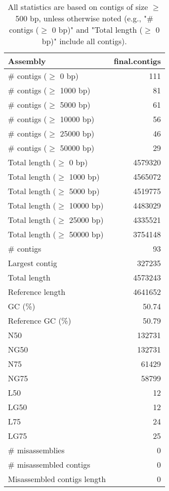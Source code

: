 \documentclass[12pt,a4paper]{article}
\begin{document}
\begin{table}[ht]
\begin{center}
\caption{All statistics are based on contigs of size $\geq$ 500 bp, unless otherwise noted (e.g., "\# contigs ($\geq$ 0 bp)" and "Total length ($\geq$ 0 bp)" include all contigs).}
\begin{tabular}{|l*{1}{|r}|}
\hline
Assembly & final.contigs \\ \hline
\# contigs ($\geq$ 0 bp) & 111 \\ \hline
\# contigs ($\geq$ 1000 bp) & 81 \\ \hline
\# contigs ($\geq$ 5000 bp) & 61 \\ \hline
\# contigs ($\geq$ 10000 bp) & 56 \\ \hline
\# contigs ($\geq$ 25000 bp) & 46 \\ \hline
\# contigs ($\geq$ 50000 bp) & 29 \\ \hline
Total length ($\geq$ 0 bp) & 4579320 \\ \hline
Total length ($\geq$ 1000 bp) & 4565072 \\ \hline
Total length ($\geq$ 5000 bp) & 4519775 \\ \hline
Total length ($\geq$ 10000 bp) & 4483029 \\ \hline
Total length ($\geq$ 25000 bp) & 4335521 \\ \hline
Total length ($\geq$ 50000 bp) & 3754148 \\ \hline
\# contigs & 93 \\ \hline
Largest contig & 327235 \\ \hline
Total length & 4573243 \\ \hline
Reference length & 4641652 \\ \hline
GC (\%) & 50.74 \\ \hline
Reference GC (\%) & 50.79 \\ \hline
N50 & 132731 \\ \hline
NG50 & 132731 \\ \hline
N75 & 61429 \\ \hline
NG75 & 58799 \\ \hline
L50 & 12 \\ \hline
LG50 & 12 \\ \hline
L75 & 24 \\ \hline
LG75 & 25 \\ \hline
\# misassemblies & 0 \\ \hline
\# misassembled contigs & 0 \\ \hline
Misassembled contigs length & 0 \\ \hline

\end{tabular}
\end{center}
\end{table}
\end{document}

